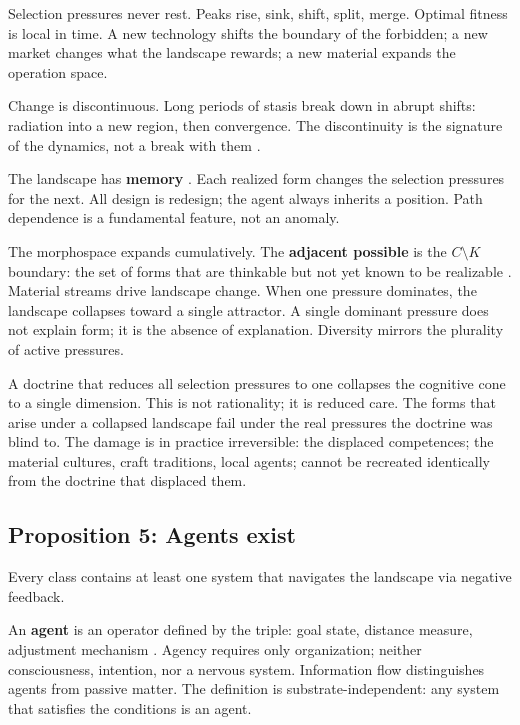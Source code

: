 Selection pressures never rest. Peaks rise, sink, shift, split, merge. Optimal fitness is local in time. A new technology shifts the boundary of the forbidden; a new market changes what the landscape rewards; a new material expands the operation space.

Change is discontinuous. Long periods of stasis break down in abrupt shifts: radiation into a new region, then convergence. The discontinuity is the signature of the dynamics, not a break with them \parencite{ElredgeGould1972}.

The landscape has \textbf{memory} \parencite{Arthur1994}. Each realized form changes the selection pressures for the next. All design is redesign; the agent always inherits a position. Path dependence is a fundamental feature, not an anomaly.

The morphospace expands cumulatively. The \textbf{adjacent possible} is the $C \setminus K$ boundary: the set of forms that are thinkable but not yet known to be realizable \parencite{Kauffman1993}. Material streams drive landscape change. When one pressure dominates, the landscape collapses toward a single attractor. A single dominant pressure does not explain form; it is the absence of explanation. Diversity mirrors the plurality of active pressures.

A doctrine that reduces all selection pressures to one collapses the cognitive cone to a single dimension. This is not rationality; it is reduced care. The forms that arise under a collapsed landscape fail under the real pressures the doctrine was blind to. The damage is in practice irreversible: the displaced competences; the material cultures, craft traditions, local agents; cannot be recreated identically from the doctrine that displaced them.

\subsection{Proposition 5: Agents exist}
\label{sec:prop5}

Every class contains at least one system that navigates the landscape via negative feedback.

An \textbf{agent} is an operator defined by the triple: goal state, distance measure, adjustment mechanism \parencite{Rosenblueth1943, Wiener1948, Ashby1956}. Agency requires only organization; neither consciousness, intention, nor a nervous system. Information flow distinguishes agents from passive matter. The definition is substrate-independent: any system that satisfies the conditions is an agent.


